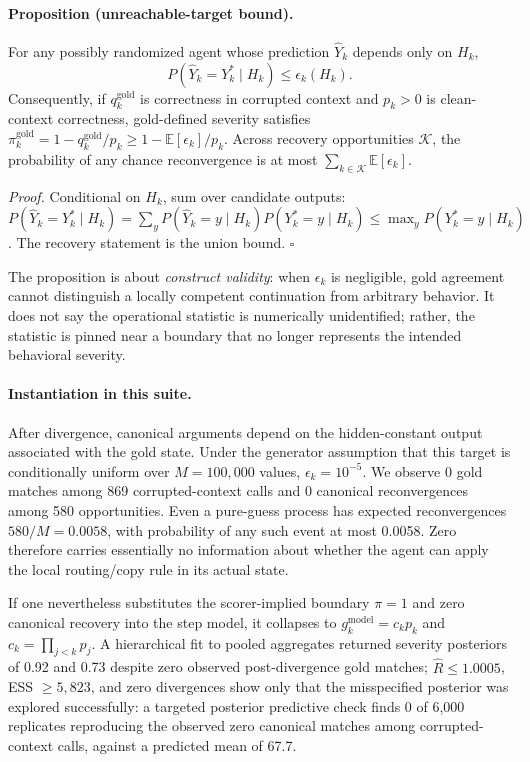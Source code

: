 \documentclass{article}
\begin{document}
\paragraph{Proposition (unreachable-target bound).}
For any possibly randomized agent whose prediction $\widehat Y_k$ depends only on $H_k$,
\begin{equation}
P(\widehat Y_k=Y_k^*\mid H_k)\le \epsilon_k(H_k).
\end{equation}
Consequently, if $q_k^{\mathrm{gold}}$ is correctness in corrupted context and $p_k>0$ is clean-context correctness, gold-defined severity satisfies $\pi_k^{\mathrm{gold}}=1-q_k^{\mathrm{gold}}/p_k\ge1-\mathbb E[\epsilon_k]/p_k$. Across recovery opportunities $\mathcal K$, the probability of any chance reconvergence is at most $\sum_{k\in\mathcal K}\mathbb E[\epsilon_k]$.

\emph{Proof.} Conditional on $H_k$, sum over candidate outputs: $P(\widehat Y_k=Y_k^*\mid H_k)=\sum_yP(\widehat Y_k=y\mid H_k)P(Y_k^*=y\mid H_k)\le\max_yP(Y_k^*=y\mid H_k)$. The recovery statement is the union bound. \hfill$\square$

The proposition is about \emph{construct validity}: when $\epsilon_k$ is negligible, gold agreement cannot distinguish a locally competent continuation from arbitrary behavior. It does not say the operational statistic is numerically unidentified; rather, the statistic is pinned near a boundary that no longer represents the intended behavioral severity.

\paragraph{Instantiation in this suite.}
After divergence, canonical arguments depend on the hidden-constant output associated with the gold state. Under the generator assumption that this target is conditionally uniform over $M=100{,}000$ values, $\epsilon_k=10^{-5}$. We observe 0 gold matches among 869 corrupted-context calls and 0 canonical reconvergences among 580 opportunities. Even a pure-guess process has expected reconvergences $580/M=0.0058$, with probability of any such event at most 0.0058. Zero therefore carries essentially no information about whether the agent can apply the local routing/copy rule in its actual state.

If one nevertheless substitutes the scorer-implied boundary $\pi=1$ and zero canonical recovery into the step model, it collapses to $g_k^{\mathrm{model}}=c_kp_k$ and $c_k=\prod_{j<k}p_j$. A hierarchical fit to pooled aggregates returned severity posteriors of 0.92 and 0.73 despite zero observed post-divergence gold matches; $\hat R\le1.0005$, ESS $\ge5{,}823$, and zero divergences show only that the misspecified posterior was explored successfully: a targeted posterior predictive check finds 0 of 6{,}000 replicates reproducing the observed zero canonical matches among corrupted-context calls, against a predicted mean of 67.7.
\end{document}
